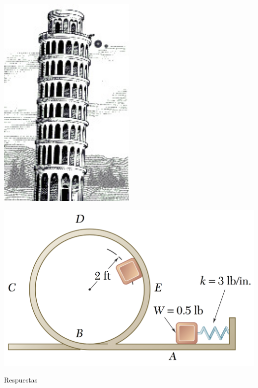 \documentclass[]{article}
\begin{document}
\begin{enumerate}
\noindent
\begin{minipage}{0.5\textwidth}
    \centering
    \includegraphics[width=0.5\textwidth]{pizza}
    \label{fig:caida}
\end{minipage}
\begin{minipage}{0.5\textwidth}
    \vspace{1.5cm}
    \centering
    \includegraphics[width=\textwidth]{bucle}
    \label{fig:bucle}
\end{minipage}
\end{enumerate}

\newpage
\begin{center}
{\sc \huge Respuestas}
\end{center}
\end{document}

